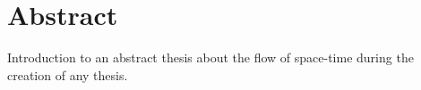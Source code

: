 \chapter{Abstract}
%
Introduction to an abstract thesis about the flow of space-time during the creation of any thesis.